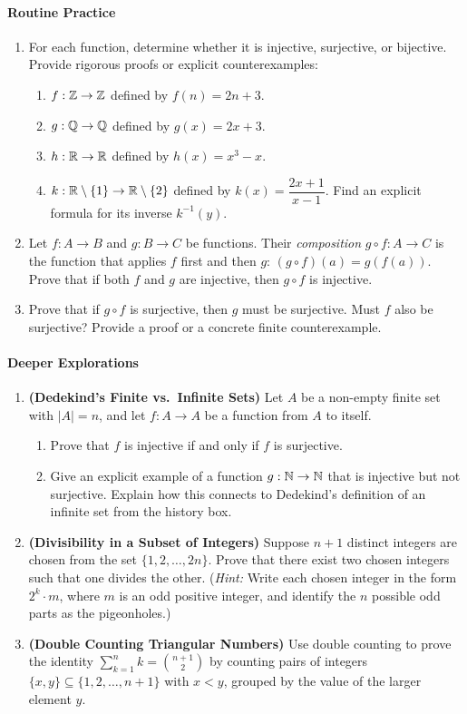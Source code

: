\paragraph{Routine Practice}
\begin{enumerate}[resume]
\item For each function, determine whether it is injective, surjective, or bijective. Provide rigorous proofs or explicit counterexamples:
\begin{enumerate}[label=(\alph*)]
\item $f: \mathbb{Z} \to \mathbb{Z}$ defined by $f(n) = 2n + 3$.
\item $g: \mathbb{Q} \to \mathbb{Q}$ defined by $g(x) = 2x + 3$.
\item $h: \mathbb{R} \to \mathbb{R}$ defined by $h(x) = x^3 - x$.
\item $k: \mathbb{R} \setminus \{1\} \to \mathbb{R} \setminus \{2\}$ defined by $k(x) = \dfrac{2x + 1}{x - 1}$. Find an explicit formula for its inverse $k^{-1}(y)$.
\end{enumerate}
\item Let $f: A \to B$ and $g: B \to C$ be functions. Their \emph{composition} $g \circ f: A \to C$ is the function that applies $f$ first and then $g$: $(g \circ f)(a) = g(f(a))$. Prove that if both $f$ and $g$ are injective, then $g \circ f$ is injective.
\item Prove that if $g \circ f$ is surjective, then $g$ must be surjective. Must $f$ also be surjective? Provide a proof or a concrete finite counterexample.
\end{enumerate}

\paragraph{Deeper Explorations}
\begin{enumerate}[resume]
\item \textbf{(Dedekind's Finite vs.\ Infinite Sets)} Let $A$ be a non-empty finite set with $|A| = n$, and let $f: A \to A$ be a function from $A$ to itself.
\begin{enumerate}[label=(\alph*)]
\item Prove that $f$ is injective if and only if $f$ is surjective.
\item Give an explicit example of a function $g: \mathbb{N} \to \mathbb{N}$ that is injective but not surjective. Explain how this connects to Dedekind's definition of an infinite set from the history box.
\end{enumerate}
\item \textbf{(Divisibility in a Subset of Integers)} Suppose $n+1$ distinct integers are chosen from the set $\{1, 2, \dots, 2n\}$. Prove that there exist two chosen integers such that one divides the other. (\emph{Hint:} Write each chosen integer in the form $2^k \cdot m$, where $m$ is an odd positive integer, and identify the $n$ possible odd parts as the pigeonholes.)
\item \textbf{(Double Counting Triangular Numbers)} Use double counting to prove the identity $\sum_{k=1}^{n} k = \binom{n+1}{2}$ by counting pairs of integers $\{x, y\} \subseteq \{1, 2, \dots, n+1\}$ with $x < y$, grouped by the value of the larger element $y$.
\end{enumerate}

\newpage

